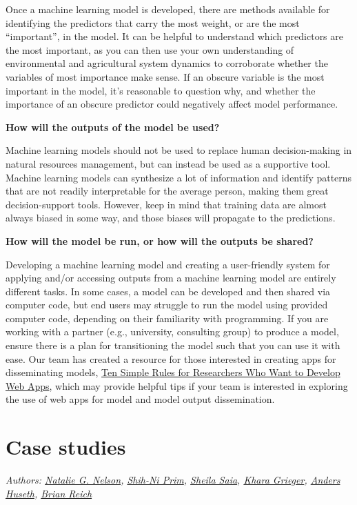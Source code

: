 \documentclass[
]{book}
\begin{document}
Once a machine learning model is developed, there are methods available for identifying the predictors that carry the most weight, or are the most ``important'', in the model. It can be helpful to understand which predictors are the most important, as you can then use your own understanding of environmental and agricultural system dynamics to corroborate whether the variables of most importance make sense. If an obscure variable is the most important in the model, it's reasonable to question why, and whether the importance of an obscure predictor could negatively affect model performance.

\textbf{How will the outputs of the model be used?}

Machine learning models should not be used to replace human decision-making in natural resources management, but can instead be used as a supportive tool. Machine learning models can synthesize a lot of information and identify patterns that are not readily interpretable for the average person, making them great decision-support tools. However, keep in mind that training data are almost always biased in some way, and those biases will propagate to the predictions.

\textbf{How will the model be run, or how will the outputs be shared?}

Developing a machine learning model and creating a user-friendly system for applying and/or accessing outputs from a machine learning model are entirely different tasks. In some cases, a model can be developed and then shared via computer code, but end users may struggle to run the model using provided computer code, depending on their familiarity with programming. If you are working with a partner (e.g., university, consulting group) to produce a model, ensure there is a plan for transitioning the model such that you can use it with ease. Our team has created a resource for those interested in creating apps for disseminating models, \href{https://journals.plos.org/ploscompbiol/article?id=10.1371/journal.pcbi.1009663}{Ten Simple Rules for Researchers Who Want to Develop Web Apps}, which may provide helpful tips if your team is interested in exploring the use of web apps for model and model output dissemination.

\hypertarget{case-studies}{%
\chapter{Case studies}\label{case-studies}}

\emph{Authors: \href{https://bae.ncsu.edu/people/nnelson4/}{Natalie G. Nelson}, \href{https://www.linkedin.com/in/shih-ni-prim-14033336/}{Shih-Ni Prim}, \href{https://sheilasaia.rbind.io/}{Sheila Saia}, \href{https://cals.ncsu.edu/applied-ecology/people/kdgriege/}{Khara Grieger}, \href{https://cals.ncsu.edu/entomology-and-plant-pathology/people/ashuseth/}{Anders Huseth}, \href{https://statistics.sciences.ncsu.edu/people/bjreich/}{Brian Reich}}
\end{document}
